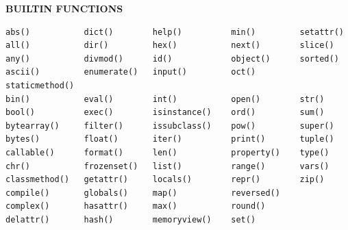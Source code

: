 \documentclass[9pt,a4wide]{extarticle}
\begin{document}
\bigskip
{\LARGE\bf BUILTIN FUNCTIONS}

\begin{verbatim}
abs()           dict()        help()          min()         setattr()
all()           dir()         hex()           next()        slice()
any()           divmod()      id()            object()      sorted()
ascii()         enumerate()   input()         oct()         staticmethod()
bin()           eval()        int()           open()        str()
bool()          exec()        isinstance()    ord()         sum()
bytearray()     filter()      issubclass()    pow()         super()
bytes()         float()       iter()          print()       tuple()
callable()      format()      len()           property()    type()
chr()           frozenset()   list()          range()       vars()
classmethod()   getattr()     locals()        repr()        zip()
compile()       globals()     map()           reversed()  
complex()       hasattr()     max()           round() 
delattr()       hash()        memoryview()    set() 
\end{verbatim}

\bigskip
\end{document}

